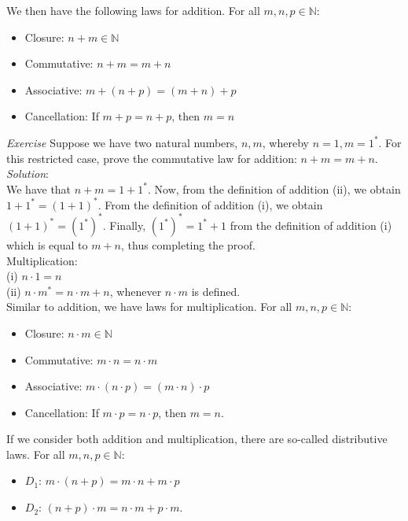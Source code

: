 We then have the following laws for addition.  For all $m,n,p \in \mathbb{N}$:\\
\begin{itemize}
\item Closure: $n+m \in \mathbb{N}$
\item Commutative: $n+m=m+n$
\item Associative: $m + ( n+p) =(m+n)+p$
\item Cancellation: If $m+p=n+p$, then $m=n$
\end{itemize}

\textit{Exercise} Suppose we have two natural numbers, $n,m$, whereby $n=1, m=1^{*}$.  For this restricted case, prove the commutative law for addition: $n+m=m+n$.\\
\textit{Solution}:\\
We have that $n+m=1+1^{*}$.  Now, from the definition of addition (ii), we obtain $1+1^{*}=(1+1)^{*}$.  From the definition of addition (i), we obtain $(1+1)^{*}=(1^{*})^{*}$.  Finally, $(1^{*})^{*}=1^{*}+1$ from the definition of addition (i) which is equal to $m+n$, thus completing the proof.\\

Multiplication:\\
(i) $n \cdot 1 = n$\\
(ii) $n \cdot m^{*}=n \cdot m + n$, whenever $n \cdot m$ is defined.\\

Similar to addition, we have laws for multiplication.  For all $m,n,p \in \mathbb{N}$:\\
\begin{itemize}
\item Closure: $n \cdot m \in \mathbb{N}$
\item Commutative: $m \cdot n = n \cdot m$
\item Associative: $m \cdot (n \cdot p) = (m \cdot n) \cdot p$
\item Cancellation: If $m \cdot p = n \cdot p$, then $m=n$.
\end{itemize} 

If we consider both addition and multiplication, there are so-called distributive laws.  For all $m,n,p \in \mathbb{N}$:\\
\begin{itemize}
\item $D_{1}$: $m \cdot (n+p)=m \cdot n + m \cdot p$
\item $D_{2}$: $(n+p) \cdot m = n \cdot m + p \cdot m$.
\end{itemize}

